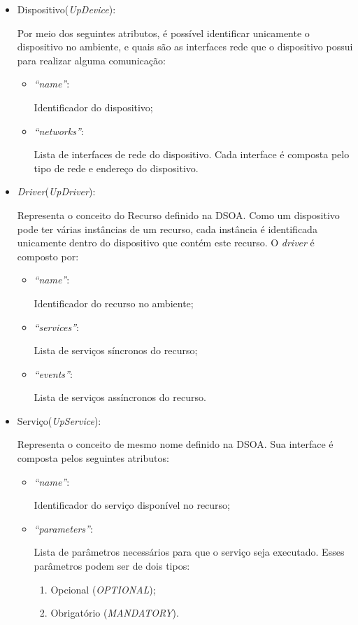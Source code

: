 \begin{itemize}
	\item Dispositivo(\emph{UpDevice}):
	
		Por meio dos seguintes atributos, é possível identificar unicamente o dispositivo no ambiente, e quais são as interfaces rede que o dispositivo possui para realizar alguma comunicação:
		\begin{itemize}
			\item \emph{``name''}: 
			
			Identificador do dispositivo;
			\item \emph{``networks''}: 

			Lista de interfaces de rede do dispositivo. Cada interface é composta pelo tipo de rede e endereço do dispositivo.
		\end{itemize}
	\item \emph{Driver}(\emph{UpDriver}): 

		Representa o conceito do Recurso definido na DSOA. Como um dispositivo pode ter várias instâncias de um recurso, cada instância é identificada unicamente dentro do dispositivo que contém este recurso. O \emph{driver} é composto por:
		\begin{itemize}
			\item \emph{``name''}:

				Identificador do recurso no ambiente;
			\item \emph{``services''}:
				
				Lista de serviços síncronos do recurso;
			\item \emph{``events''}:
				
				Lista de serviços assíncronos do recurso.
		\end{itemize}
	\item Serviço(\emph{UpService}): 

		Representa o conceito de mesmo nome definido na DSOA. Sua interface é composta pelos seguintes atributos:
		\begin{itemize}
			\item \emph{``name''}:

				Identificador do serviço disponível no recurso;
			\item \emph{``parameters''}:
				
				Lista de parâmetros necessários para que o serviço seja executado. Esses parâmetros podem ser de dois tipos:
				\begin{enumerate}
					\item Opcional (\emph{OPTIONAL});
					\item Obrigatório (\emph{MANDATORY}).
				\end{enumerate}
		\end{itemize}
\end{itemize}

